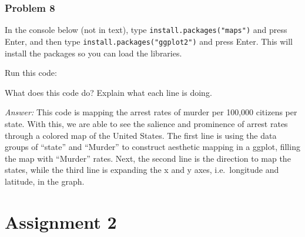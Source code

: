 \documentclass[
]{article}
\newenvironment{Shaded}{\begin{snugshade}}{\end{snugshade}}
\newcommand{\AttributeTok}[1]{\textcolor[rgb]{0.77,0.63,0.00}{#1}}
\newcommand{\FunctionTok}[1]{\textcolor[rgb]{0.00,0.00,0.00}{#1}}
\newcommand{\NormalTok}[1]{#1}
\newcommand{\SpecialCharTok}[1]{\textcolor[rgb]{0.00,0.00,0.00}{#1}}
\newcommand{\StringTok}[1]{\textcolor[rgb]{0.31,0.60,0.02}{#1}}
\begin{document}
\hypertarget{problem-8}{%
\subsubsection{Problem 8}\label{problem-8}}

In the console below (not in text), type
\texttt{install.packages("maps")} and press Enter, and then type
\texttt{install.packages("ggplot2")} and press Enter. This will install
the packages so you can load the libraries.

Run this code:

\begin{Shaded}
\end{Shaded}

What does this code do? Explain what each line is doing.

\emph{Answer:} This code is mapping the arrest rates of murder per
100,000 citizens per state. With this, we are able to see the salience
and prominence of arrest rates through a colored map of the United
States. The first line is using the data groups of ``state'' and
``Murder'' to construct aesthetic mapping in a ggplot, filling the map
with ``Murder'' rates. Next, the second line is the direction to map the
states, while the third line is expanding the x and y axes,
i.e.~longitude and latitude, in the graph.

\hypertarget{assignment-2}{%
\section{Assignment 2}\label{assignment-2}}
\end{document}
